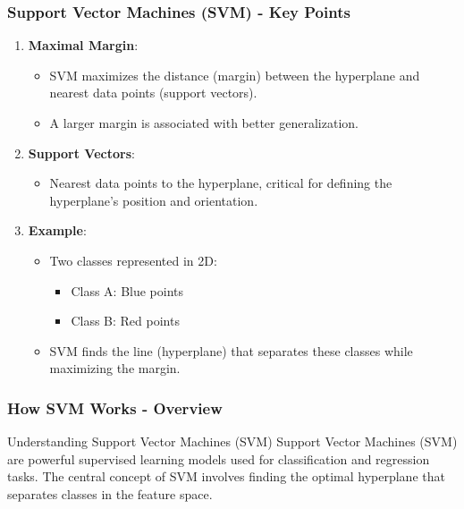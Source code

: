 \documentclass[aspectratio=169]{beamer}
\begin{document}
\begin{frame}[fragile]
    \frametitle{Support Vector Machines (SVM) - Key Points}
    \begin{enumerate}
        \item \textbf{Maximal Margin}:
        \begin{itemize}
            \item SVM maximizes the distance (margin) between the hyperplane and nearest data points (support vectors).
            \item A larger margin is associated with better generalization.
        \end{itemize}
        
        \item \textbf{Support Vectors}:
        \begin{itemize}
            \item Nearest data points to the hyperplane, critical for defining the hyperplane's position and orientation.
        \end{itemize}
        
        \item \textbf{Example}:
        \begin{itemize}
            \item Two classes represented in 2D:
            \begin{itemize}
                \item Class A: Blue points
                \item Class B: Red points
            \end{itemize}
            \item SVM finds the line (hyperplane) that separates these classes while maximizing the margin.
        \end{itemize}
    \end{enumerate}
\end{frame}

\begin{frame}[fragile]
    \frametitle{How SVM Works - Overview}
    \begin{block}{Understanding Support Vector Machines (SVM)}
        Support Vector Machines (SVM) are powerful supervised learning models used for classification and regression tasks. The central concept of SVM involves finding the optimal hyperplane that separates classes in the feature space.
    \end{block}
\end{frame}
\end{document}
